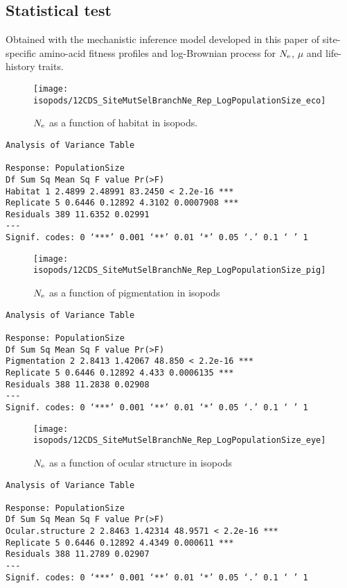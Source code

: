 \subsection{Statistical test}
Obtained with the mechanistic inference model developed in this paper of site-specific amino-acid fitness profiles and log-Brownian process for $\Ne$, $\mu$ and life-history traits.

\begin{figure}[H]
    \centering
    \texttt{[image: isopods/12CDS\_SiteMutSelBranchNe\_Rep\_LogPopulationSize\_eco]}
    \caption[$\Ne$ as a function of habitat in isopods]{$\Ne$ as a function of habitat in isopods.}
\end{figure}
\begin{verbatim}
Analysis of Variance Table

Response: PopulationSize
Df Sum Sq Mean Sq F value Pr(>F)
Habitat 1 2.4899 2.48991 83.2450 < 2.2e-16 ***
Replicate 5 0.6446 0.12892 4.3102 0.0007908 ***
Residuals 389 11.6352 0.02991
---
Signif. codes: 0 ‘***’ 0.001 ‘**’ 0.01 ‘*’ 0.05 ‘.’ 0.1 ‘ ’ 1
\end{verbatim}
\begin{figure}[H]
    \centering
    \texttt{[image: isopods/12CDS\_SiteMutSelBranchNe\_Rep\_LogPopulationSize\_pig]}
    \caption[$\Ne$ as a function of pigmentation in isopods]{$\Ne$ as a function of pigmentation in isopods}
\end{figure}
\begin{verbatim}
Analysis of Variance Table

Response: PopulationSize
Df Sum Sq Mean Sq F value Pr(>F)
Pigmentation 2 2.8413 1.42067 48.850 < 2.2e-16 ***
Replicate 5 0.6446 0.12892 4.433 0.0006135 ***
Residuals 388 11.2838 0.02908
---
Signif. codes: 0 ‘***’ 0.001 ‘**’ 0.01 ‘*’ 0.05 ‘.’ 0.1 ‘ ’ 1
\end{verbatim}
\begin{figure}[H]
    \centering
    \texttt{[image: isopods/12CDS\_SiteMutSelBranchNe\_Rep\_LogPopulationSize\_eye]}
    \caption[$\Ne$ as a function of ocular structure in isopods]{$\Ne$ as a function of ocular structure in isopods}
\end{figure}
\begin{verbatim}
Analysis of Variance Table

Response: PopulationSize
Df Sum Sq Mean Sq F value Pr(>F)
Ocular.structure 2 2.8463 1.42314 48.9571 < 2.2e-16 ***
Replicate 5 0.6446 0.12892 4.4349 0.000611 ***
Residuals 388 11.2789 0.02907
---
Signif. codes: 0 ‘***’ 0.001 ‘**’ 0.01 ‘*’ 0.05 ‘.’ 0.1 ‘ ’ 1
\end{verbatim}
